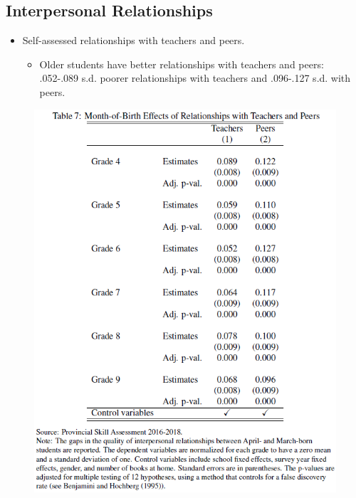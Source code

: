\documentclass[../root]{subfiles}
\begin{document}
\begin{figure}[ht]
    \end{figure}

    \subsection{Interpersonal Relationships}

    \begin{itemize}
      \item Self-assessed relationships with teachers and peers.
      \begin{itemize}
        \item Older students have better relationships with teachers and peers: .052-.089 s.d. poorer relationships with teachers and .096-.127 s.d. with peers.
      \end{itemize}
    \end{itemize}

    \begin{figure}[ht]
      \centering
      \includegraphics[scale = 1.1]{0904tanji/T7}
    \end{figure}
\end{document}

